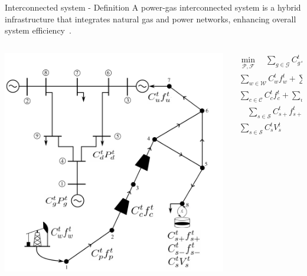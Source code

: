 \documentclass[hyperref={colorlinks,citecolor=blue,linkcolor=blue,urlcolor=blue}]{beamer}
\begin{document}
\begin{frame}{Interconnected system - Definition}
A power-gas interconnected system is a hybrid infrastructure that integrates natural gas and power networks, enhancing overall system efficiency~\cite{Duan_Liu_Yang_2022}. 
\begin{columns}
\begin{column}{0.5\textwidth}
   \begin{center}
     \includegraphics[width=1\textwidth]{figures/network_math_alternative.pdf}
     \end{center}
\end{column}
\begin{column}{0.5\textwidth}  
\begin{equation} \label{eq:obj_func_integrated}
\begin{split}
\min_{\mathcal{P}, \mathcal{F}} \quad  \sum_{g \in \mathcal{G}} C_{g}^t {P_{g}^t} + \sum_{d \in \mathcal{D}} C_{d}^t {P_{d}^t} +  \\ \sum_{w \in \mathcal{W}} C_{w}^t {f_{w}^t} +  \sum_{p \in \mathcal{P}} C_{p}^t {f_{p}^t}  + \\ \sum_{c \in \mathcal{C}} C_{c}^t {f_{c}^t} + \sum_{u \in \mathcal{U}} C_{u}^{t} {f_{u}^{t}} + \\ \quad \sum_{s \in \mathcal{S}} C_{s+}^{t} {f_{s+}^{t}}  + \sum_{s \in \mathcal{S}} C_{s-}^{t} {f_{s-}^{t}} + \\ \sum_{s \in \mathcal{S}} C_{s}^{t} {V_{s}^{t}}
\end{split}
\end{equation} 
\end{column}
\end{columns}
\end{frame}
\end{document}
